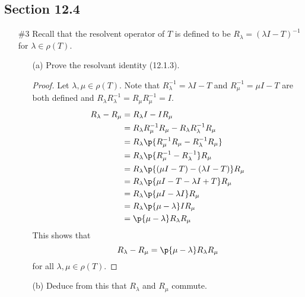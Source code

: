 \documentclass[11pt, oneside]{article}
\begin{document}
\pagebreak
\subsection*{Section 12.4}
\begin{enumerate}
  \item[\#3] %
    Recall that the resolvent operator of $T$ is defined to be
    $R_{\lambda} = (\lambda I - T)^{-1}$ for $\lambda \in \rho(T)$.
    \begin{enumerate}
      \item[(a)] %
        Prove the resolvant identity (12.1.3).

        \begin{proof}
          Let $\lambda, \mu \in \rho(T)$.
          Note that $R_{\lambda}^{-1} = \lambda I - T$ and
          $R_{\mu}^{-1} = \mu I - T$ are both defined and
          $R_{\lambda}R_{\lambda}^{-1} = R_{\mu}R_{\mu}^{-1} = I$.
          \begin{align*}
            R_{\lambda} - R_{\mu} &= R_{\lambda}I - IR_{\mu} \\
            &= R_{\lambda}R_{\mu}^{-1}R_{\mu} - R_{\lambda}R_{\lambda}^{-1}R_{\mu} \\
            &= R_{\lambda}\p{R_{\mu}^{-1}R_{\mu} - R_{\lambda}^{-1}R_{\mu}} \\
            &= R_{\lambda}\p{R_{\mu}^{-1} - R_{\lambda}^{-1}}R_{\mu} \\
            &= R_{\lambda}\p{(\mu I - T) - (\lambda I - T)}R_{\mu} \\
            &= R_{\lambda}\p{\mu I - T - \lambda I + T}R_{\mu} \\
            &= R_{\lambda}\p{\mu I - \lambda I}R_{\mu} \\
            &= R_{\lambda}\p{\mu - \lambda}IR_{\mu} \\
            &= \p{\mu - \lambda} R_{\lambda}R_{\mu} \\
          \end{align*}
          This shows that
          \[
            R_{\lambda} - R_{\mu} = \p{\mu - \lambda} R_{\lambda}R_{\mu}
          \]
          for all $\lambda, \mu \in \rho(T)$.
        \end{proof}

      \item[(b)] %
        Deduce from this that $R_{\lambda}$ and $R_{\mu}$ commute.


\end{enumerate}
\end{enumerate}
\end{document}
